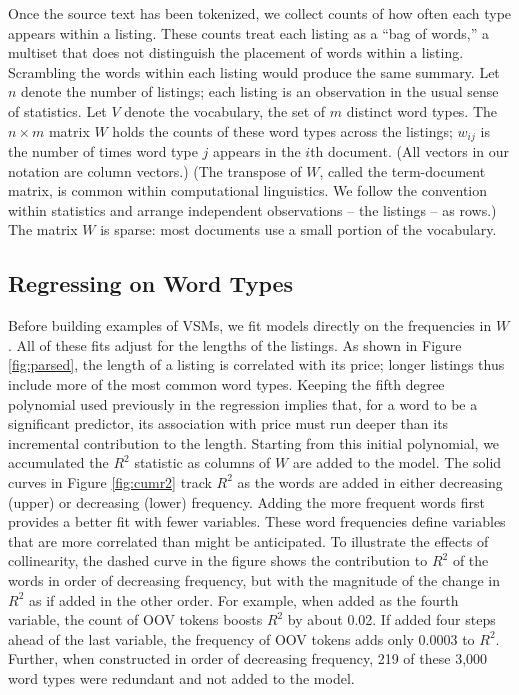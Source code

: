 \documentclass[10pt]{article}
\begin{document}
 Once the source text has been tokenized, we collect counts of how often each
 type appears within a listing.  These counts treat each listing as a ``bag of
 words,'' a multiset that does not distinguish the placement of words within a
 listing. Scrambling the words within each listing would produce the same
 summary.  Let $n$ denote the number of listings; each listing is an observation
 in the usual sense of statistics.  Let $V$ denote the vocabulary, the set of
 $m$ distinct word types.  The $n \times m$ matrix $W$ holds the counts of these
 word types across the listings; $w_{ij}$ is the number of times word type $j$
 appears in the $i$th document.  (All vectors in our notation are column
 vectors.)  (The transpose of $W$, called the term-document matrix, is common
 within computational linguistics. We follow the convention within statistics
 and arrange independent observations -- the listings -- as rows.)  The matrix
 $W$ is sparse: most documents use a small portion of the vocabulary.


\subsection{ Regressing on Word Types }  %

 Before building examples of VSMs, we fit models directly on the frequencies in $W$.   All of these fits adjust for the lengths of the listings.  As shown in Figure \ref{fig:parsed}, the length of a listing is correlated with its price; longer listings thus include more of the most common word types.  Keeping the fifth degree polynomial used previously in the regression implies that, for a word to be a significant predictor, its association with price must run deeper than its incremental contribution to the length.  Starting from this initial polynomial, we accumulated the $R^2$ statistic as columns of $W$ are added to the model.  The solid curves in Figure \ref{fig:cumr2} track $R^2$ as the words are added in either decreasing (upper) or decreasing (lower) frequency.  Adding the more frequent words first provides a better fit with fewer variables.  These word frequencies define variables that are more correlated than might be anticipated.  To illustrate the effects of collinearity, the dashed curve in the figure shows the contribution to $R^2$ of the words in order of decreasing frequency, but with the magnitude of the change in $R^2$ as if added in the other order.  For example, when added as the fourth variable, the count of OOV tokens boosts $R^2$ by about 0.02.  If added four steps ahead of the last variable, the frequency of OOV tokens adds only 0.0003 to  $R^2$.  Further, when constructed in order of decreasing frequency, 219 of these 3,000 word types were redundant and not added to the model.
\end{document}
